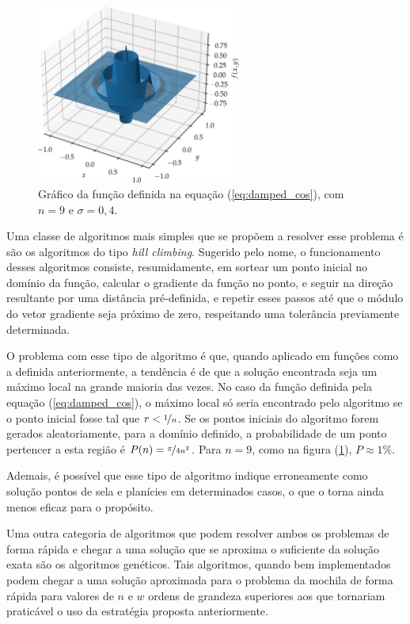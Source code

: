 \begin{figure}
  \centering
  \includegraphics[width=0.6\textwidth]{imagens/damped_cossine.png}
  \caption{Gráfico da função definida na equação (\ref{eq:damped_cos}), com $ n = 9 $ e $ \sigma = 0,4 $.}
  \label{fig:damped_cos}
\end{figure}

Uma classe de algoritmos mais simples que se propõem a resolver esse problema é são os algoritmos do
tipo \textit{hill climbing}. Sugerido pelo nome, o funcionamento desses algoritmos consiste, resumidamente,
em sortear um ponto inicial no domínio da função, calcular o gradiente da função no ponto, e seguir
na direção resultante por uma distância pré-definida, e repetir esses passos até que o módulo do
vetor gradiente seja próximo de zero, respeitando uma tolerância previamente determinada. 

O problema com esse tipo de algoritmo é que, quando aplicado em funções como a definida anteriormente, a tendência é
de que a solução encontrada seja um máximo local na grande maioria das vezes. No caso da função definida
pela equação (\ref{eq:damped_cos}), o máximo local só seria encontrado pelo algoritmo se o ponto inicial
fosse tal que $ r < \nicefrac{1}{n} $. Se os pontos iniciais do algoritmo forem gerados aleatoriamente,
para a domínio definido, a probabilidade de um ponto pertencer a esta região é $ P(n) = \nicefrac{\pi}{4n^2} $.
Para $ n = 9 $, como na figura (\ref{fig:damped_cos}), $ P \approx 1\% $. 

Ademais, é possível que esse tipo
de algoritmo indique erroneamente como solução pontos de sela e planícies em determinados casos, o que o
torna ainda menos eficaz para o propósito.

Uma outra categoria de algoritmos que podem resolver ambos os problemas de forma rápida e chegar a uma
solução que se aproxima o suficiente da solução exata são os algoritmos genéticos. Tais algoritmos,
quando bem implementados podem chegar a uma solução aproximada para o problema da mochila de forma
rápida para valores de $n$ e $w$ ordens de grandeza superiores aos que tornariam praticável o uso da
estratégia proposta anteriormente. 

